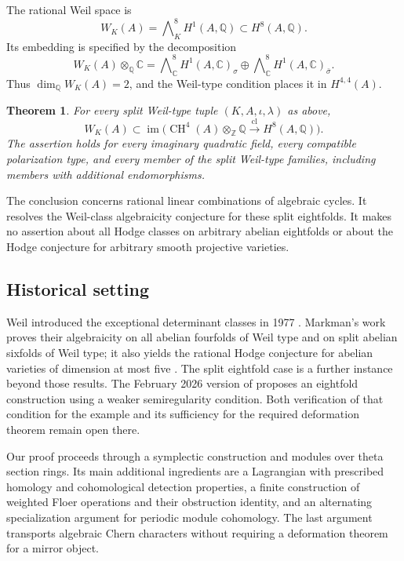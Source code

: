 \documentclass[11pt]{article}
\newtheorem{theorem}{Theorem}[section]
\theoremstyle{definition}
\theoremstyle{remark}
\newcommand{\Q}{\mathbb Q}
\newcommand{\C}{\mathbb C}
\newcommand{\Z}{\mathbb Z}
\DeclareMathOperator{\CH}{CH}
\DeclareMathOperator{\im}{im}
\numberwithin{equation}{section}
\begin{document}
The rational Weil space is
\[
 W_K(A)=\bigwedge\nolimits_K^8 H^1(A,\Q)\subset H^8(A,\Q).
\]
Its embedding is specified by the decomposition
\[
 W_K(A)\otimes_\Q\C=
 \bigwedge\nolimits_\C^8H^1(A,\C)_\sigma
 \oplus
 \bigwedge\nolimits_\C^8H^1(A,\C)_{\bar\sigma}.
\]
Thus $\dim_\Q W_K(A)=2$, and the Weil-type condition places it in
$H^{4,4}(A)$.

\begin{theorem}
\label{intro:main}
For every split Weil-type tuple $(K,A,\iota,\lambda)$ as above,
\[
 W_K(A)\subset
 \im\bigl(\CH^4(A)\otimes_\Z\Q
                \xrightarrow{\ \mathrm{cl}\ }H^8(A,\Q)\bigr).
\]
The assertion holds for every imaginary quadratic field, every compatible
polarization type, and every member of the split Weil-type families,
including members with additional endomorphisms.
\end{theorem}

The conclusion concerns rational linear combinations of algebraic cycles.
It resolves the Weil-class algebraicity conjecture for these split
eightfolds.  It makes no assertion about all Hodge classes on arbitrary
abelian eightfolds or about the Hodge conjecture for arbitrary smooth
projective varieties.

\subsection{Historical setting}

Weil introduced the exceptional determinant classes in 1977
\cite{weil}.  Markman's work proves their algebraicity on all abelian
fourfolds of Weil type and on split abelian sixfolds of Weil type;
it also yields the rational Hodge conjecture for abelian varieties of
dimension at most five \cite{markman-sixfold,markman-survey}.
The split eightfold case is a further instance beyond those results.
The February 2026 version of
\cite[Question~11.4 and Section~12]{markman-survey} proposes an eightfold
construction using a weaker semiregularity condition.  Both verification
of that condition for the example and its sufficiency for the required
deformation theorem remain open there.

Our proof proceeds through a symplectic construction and modules over
theta section rings.  Its main additional ingredients are a Lagrangian
with prescribed homology and cohomological detection properties, a finite
construction of weighted Floer operations and their obstruction identity,
and an alternating specialization argument for periodic module
cohomology.  The last argument transports algebraic Chern characters
without requiring a deformation theorem for a mirror object.
\end{document}
